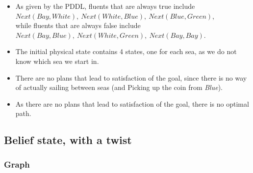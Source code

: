 \documentclass[a4paper, 11pt]{article}
\begin{document}
\begin{itemize}
	\item As given by the PDDL, fluents that are always true include \\ $Next(Bay,White), ~Next(White,Blue), ~Next(Blue,Green)$, \\
    while fluents that are always false include \\
    $Next(Bay,Blue), ~Next(White,Green), ~Next(Bay,Bay)$.
	\item The initial physical state contains 4 states, one for each sea, as we do not know which sea we start in.
	\item There are no plans that lead to satisfaction of the goal, since there is no way of actually sailing between seas (and Picking up the coin from \textit{Blue}). 
	\item As there are no plans that lead to satisfaction of the goal, there is no optimal path. 
\end{itemize}

\subsection{Belief state, with a twist}

\subsubsection{Graph}

\end{document}
